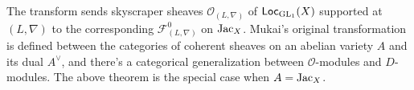 The transform sends skyscraper sheaves $\mathcal{O}_{(L, \nabla)}$ of $\operatorname{\mathsf{Loc}}_{\operatorname{\mathrm{GL}}_1}(X)$ supported at $(L, \nabla)$ to 
the corresponding $\mathcal{F}_{(L,\nabla)}^{0}$ on $\operatorname{\mathrm{Jac}}_X$.
Mukai's original transformation is defined between the categories of coherent sheaves on an abelian 
variety $A$ and its dual $A^{\vee}$, and there's a categorical generalization between $\mathcal{O}$-modules and $D$-modules.
The above theorem is the special case when $A = \operatorname{\mathrm{Jac}}_X$.